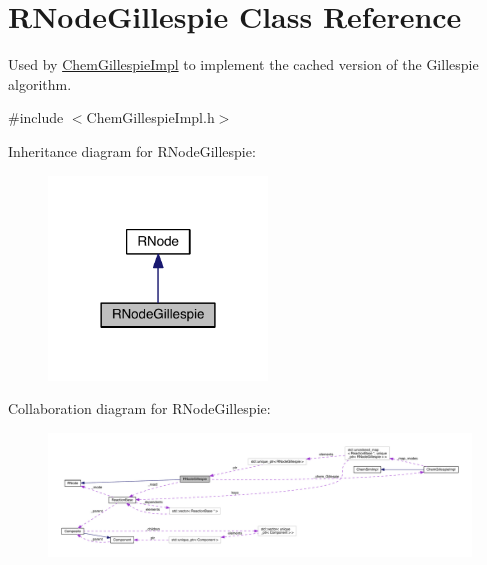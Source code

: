 \hypertarget{classRNodeGillespie}{\section{R\+Node\+Gillespie Class Reference}
\label{classRNodeGillespie}
}


Used by \hyperlink{classChemGillespieImpl}{Chem\+Gillespie\+Impl} to implement the cached version of the Gillespie algorithm.  




{\ttfamily \#include $<$Chem\+Gillespie\+Impl.\+h$>$}



Inheritance diagram for R\+Node\+Gillespie\+:\nopagebreak
\begin{figure}[H]
\begin{center}
\leavevmode
\includegraphics[width=165pt]{classRNodeGillespie__inherit__graph}
\end{center}
\end{figure}


Collaboration diagram for R\+Node\+Gillespie\+:\nopagebreak
\begin{figure}[H]
\begin{center}
\leavevmode
\includegraphics[width=350pt]{classRNodeGillespie__coll__graph}
\end{center}
\end{figure}

